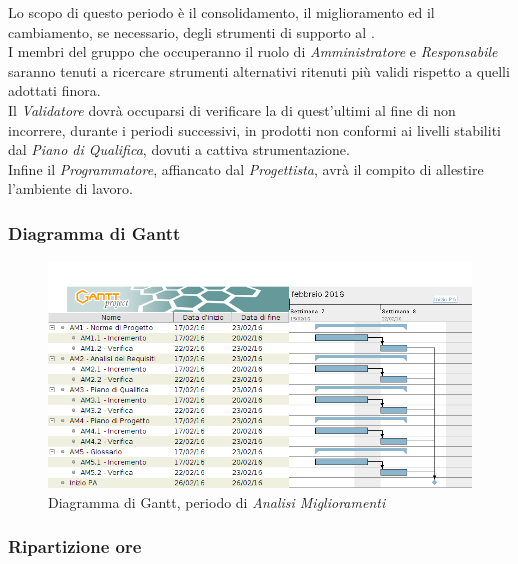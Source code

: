 Lo scopo di questo periodo \`e il consolidamento, il miglioramento ed il cambiamento, se necessario, degli strumenti di supporto al .\\
I membri del gruppo che occuperanno il ruolo di \textit{Amministratore} e \textit{Responsabile} saranno tenuti a ricercare strumenti alternativi ritenuti pi\`u validi rispetto a quelli adottati finora.\\
Il \textit{Validatore} dovr\`a occuparsi di verificare la  di quest'ultimi al fine di non incorrere, durante i periodi successivi, in prodotti non conformi ai livelli stabiliti dal \textit{Piano di Qualifica}, dovuti a cattiva strumentazione.\\
Infine il \textit{Programmatore}, affiancato dal \textit{Progettista}, avr\`a il compito di allestire l'ambiente di lavoro.

\subsubsection{Diagramma di Gantt}
\begin{figure}[ht!]
\includegraphics[width=1\textwidth]{res/img/pianificazione/AnalisiMiglioramenti.png}
\caption{Diagramma di Gantt, periodo di \textit{Analisi Miglioramenti}}
\end{figure}


\subsubsection{Ripartizione ore}

